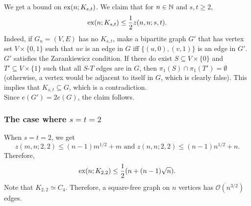 \documentclass{article}
\begin{document}
			We get a bound on $\operatorname{ex}(n;K_{s,t})$. We claim that for $n\in\mathbb{N}$ and $s,t\ge 2$,
			\begin{equation}
				\label{eqn: exx n Kst and z n n s t}
				\operatorname{ex}(n;K_{s,t}) \le \frac{1}{2} z(n,n;s,t).
			\end{equation}
			Indeed, if $G_n = (V,E)$ has no $K_{s,t}$, make a bipartite graph $G'$ that has vertex set $V \times \{0,1\}$ such that $uv$ is an edge in $G$ iff $\{(u,0),(v,1)\}$ is an edge in $G'$.\\
			$G'$ satisfies the Zarankiewicz condition. If there do exist $S \subseteq V\times\{0\}$ and $T' \subseteq V \times \{1\}$ such that all $S$-$T$ edges are in $G$, then $\pi_1(S) \cap \pi_1(T') = \emptyset$ (otherwise, a vertex would be adjacent to itself in $G$, which is clearly false). This implies that $K_{s,t} \subseteq G$, which is a contradiction.\\
			Since $e(G') = 2e(G)$, the claim follows.

		\subsubsection{The case where \texorpdfstring{$s=t=2$}{s=t=2}}

			When $s=t=2$, we get
			\[ z(m,n;2,2) \le (n-1)m^{1/2} + m \text{ and } z(n,n;2,2) \le (n-1)n^{1/2} + n. \]
			Therefore,
			\[ \operatorname{ex}(n;K_{2,2}) \le \frac{1}{2} (n + (n-1)\sqrt{n}). \]
			Note that $K_{2,2}\simeq C_4$. Therefore, a square-free graph on $n$ vertices has $\mathcal{O}(n^{3/2})$ edges.\\
\end{document}
